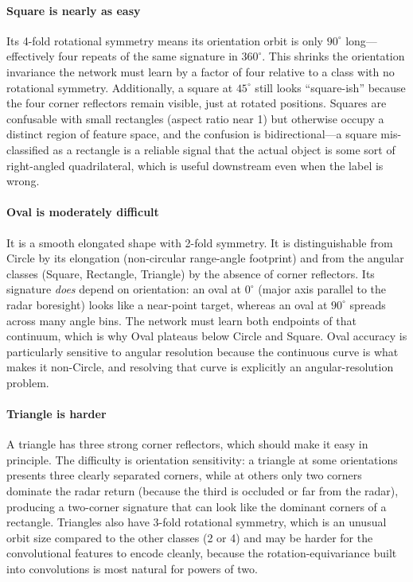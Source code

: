 \documentclass[letterpaper,11pt,leqno]{article}
\begin{document}
\paragraph{Square is nearly as easy} Its 4-fold rotational symmetry means its orientation orbit is only $90^\circ$ long---effectively four repeats of the same signature in $360^\circ$. This shrinks the orientation invariance the network must learn by a factor of four relative to a class with no rotational symmetry. Additionally, a square at $45^\circ$ still looks ``square-ish'' because the four corner reflectors remain visible, just at rotated positions. Squares are confusable with small rectangles (aspect ratio near 1) but otherwise occupy a distinct region of feature space, and the confusion is bidirectional---a square mis-classified as a rectangle is a reliable signal that the actual object is some sort of right-angled quadrilateral, which is useful downstream even when the label is wrong.

\paragraph{Oval is moderately difficult} It is a smooth elongated shape with 2-fold symmetry. It is distinguishable from Circle by its elongation (non-circular range-angle footprint) and from the angular classes (Square, Rectangle, Triangle) by the absence of corner reflectors. Its signature \emph{does} depend on orientation: an oval at $0^\circ$ (major axis parallel to the radar boresight) looks like a near-point target, whereas an oval at $90^\circ$ spreads across many angle bins. The network must learn both endpoints of that continuum, which is why Oval plateaus below Circle and Square. Oval accuracy is particularly sensitive to angular resolution because the continuous curve is what makes it non-Circle, and resolving that curve is explicitly an angular-resolution problem.

\paragraph{Triangle is harder} A triangle has three strong corner reflectors, which should make it easy in principle. The difficulty is orientation sensitivity: a triangle at some orientations presents three clearly separated corners, while at others only two corners dominate the radar return (because the third is occluded or far from the radar), producing a two-corner signature that can look like the dominant corners of a rectangle. Triangles also have 3-fold rotational symmetry, which is an unusual orbit size compared to the other classes (2 or 4) and may be harder for the convolutional features to encode cleanly, because the rotation-equivariance built into convolutions is most natural for powers of two.
\end{document}
